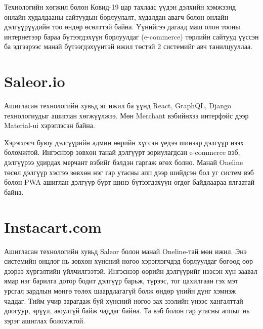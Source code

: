 Технологийн хөгжил болон Ковид-19 цар тахлаас үүдэн дэлхийн хэмжээнд онлайн худалдааны сайтуудын борлуулалт, худалдан авагч болон онлайн дэлгүүрүүдийн тоо өндөр өсөлттэй байна. Үүнийгээ дагаад маш олон тооны интернетээр бараа бүтээгдэхүүн борлуулдаг (e-commerce) төрлийн сайтууд үүссэн ба эдгээрээс манай бүтээгдэхүүнтэй ижил төстэй 2 системийг авч танилцууллаа.

    
    
\section{Saleor.io}
Ашигласан технологийн хувьд яг ижил ба үүнд React, GraphQL, Django технологиудыг ашиглан хөгжүүлжээ. Мөн Merchant вэбийнхээ интерфэйс дээр Material-ui хэрэглэсэн байна. 

Хэрэглэгч буюу дэлгүүрийн админ өөрийн хүссэн үедээ шинээр дэлгүүр нээх боломжтой. Ингэснээр зөвхөн танай дэлгүүрт зориулагдсан e-commerce вэб, дэлгүүрээ удирдах мерчант вэбийг бэлдэн гаргаж өгөх болно. Манай Oneline төсөл дэлгүүр хэсгээ зөвхөн нэг гар утасны апп дээр шийдсэн бол уг систем вэб болон PWA ашиглан дэлгүүр бүрт шинэ бүтээгдэхүүн өгдөг байдлаараа ялгаатай байна. 


\section{Instacart.com}
Ашигласан технологийн хувьд Saleor болон манай Oneline-тай мөн ижил. Энэ системийн онцлог нь зөвхөн хүнсний ногоо хэрэглэгчдэд борлуулдаг бөгөөд өөр дээрээ хүргэлтийн үйлчилгээтэй. Ингэснээр өөрийн дэлгүүрийг нээсэн хүн заавал ямар нэг барилга дотор бодит дэлгүүр барьж, түрээс, тог цахилгаан гэх мэт урсгал зардлын мөнгө төлөх шаардлагагүй болж өндөр үнийн дүнг хэмнэж чаддаг. Тийм учир зарагдаж буй хүнсний ногоо зах зээлийн үнээс хангалттай доогуур, эрүүл, аюулгүй байж чаддаг байна. Та вэб болон гар утасны аппыг нь зэрэг ашиглах боломжтой.